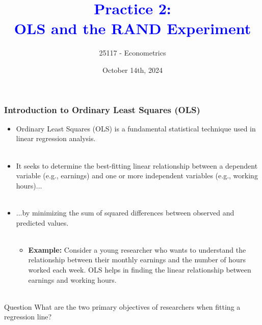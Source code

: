 \documentclass[notes,10pt, aspectratio=169]{beamer}
\title[]{\textcolor{blue}{Practice 2:\\OLS and the RAND Experiment}}
\author{25117 - Econometrics}
\institute[shortinst]{Universitat Pompeu Fabra}
\date{October 14th, 2024}
\begin{document}

\begin{frame}[plain]
\maketitle
\end{frame}

\begin{frame}
\frametitle{Introduction to Ordinary Least Squares (OLS)}
\begin{itemize}
    \item Ordinary Least Squares (OLS) is a fundamental statistical technique used in linear regression analysis.\\\\[1em]
    \item It seeks to determine the best-fitting linear relationship between a dependent variable (e.g., earnings) and one or more independent variables (e.g., working hours)...\\\\[1em]
    \item ...by minimizing the sum of squared differences between observed and predicted values.\\\\[1em]
    \begin{itemize}
        \item \textbf{Example:} Consider a young researcher who wants to understand the relationship between their monthly earnings and the number of hours worked each week. OLS helps in finding the linear relationship between earnings and working hours.\\\\[1em]
    \end{itemize}
\end{itemize}

\begin{exampleblock}{Question}
    What are the two primary objectives of researchers when fitting a regression line?
\end{exampleblock}
\end{frame}
\end{document}

